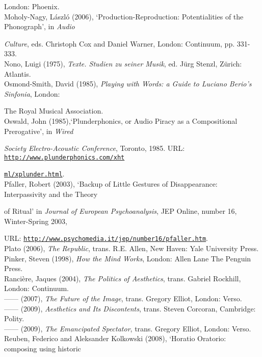 London: Phoenix. 
\hypertarget{moholy}{}\\
Moholy-Nagy, L\'{a}szl\'{o} (2006),  `Production-Reproduction: Potentialities of the Phonograph', in \emph{Audio} 

\emph{Culture}, eds. Christoph Cox and Daniel Warner, London: Continuum, pp. 331-333.
\hypertarget{nono}{}\\
Nono, Luigi (1975), \emph{Texte. Studien zu seiner Musik}, ed. J\"{u}rg Stenzl, Z\"{u}rich: Atlantis. 
\hypertarget{ossmith}{}\\
Osmond-Smith, David (1985), \emph{Playing with Words: a Guide to Luciano Berio's Sinfonia},  London: 

The Royal Musical Association. 
\hypertarget{oswald}{}\\
Oswald, John (1985),`Plunderphonics, or Audio Piracy as a Compositional Prerogative', in \emph{Wired}

\emph{Society Electro-Acoustic Conference}, Toronto, 1985. URL: \href{http://www.plunderphonics.com/xhtml/xplunder.html}{\texttt{http://www.plunderphonics.com/xht}}

\href{http://www.plunderphonics.com/xhtml/xplunder.html}{\texttt{ml/xplunder.html}}.
\hypertarget{pfaller}{}\\
Pfaller, Robert (2003), `Backup of Little Gestures of Disappearance: Interpassivity and the Theory 

of Ritual' in \emph{Journal of European Psychoanalysis}, JEP Online, number 16, Winter-Spring 2003, 

URL: \href{http://www.psychomedia.it/jep/number16/pfaller.htm}{\texttt {http://www.psychomedia.it/jep/number16/pfaller.htm}}. 
\hypertarget{plato}{}\\
Plato (2006), \emph{The Republic}, trans. R.E. Allen, New Haven: Yale University Press. 
\hypertarget{pinker}{}\\
Pinker, Steven (1998), \emph{How the Mind Works}, London: Allen Lane The Penguin Press. 
\hypertarget{ranpoli}{}\\
Ranci\`{e}re, Jaques (2004), \emph{The Politics of Aesthetics}, trans. Gabriel Rockhill, London: Continuum. 
\hypertarget{ranimg}{}\\
------ (2007), \emph{The Future of the Image}, trans. Gregory Elliot, London: Verso. 
\hypertarget{ranaesth}{}\\
------ (2009), \emph{Aesthetics and Its Discontents}, trans. Steven Corcoran, Cambridge: Polity. 
\hypertarget{ranspec}{}\\
------ (2009), \emph{The Emancipated Spectator}, trans. Gregory Elliot, London: Verso.
\hypertarget{reuben}{}\\
Reuben, Federico and Aleksander Kolkowski (2008), `Horatio Oratorio: composing using historic 

